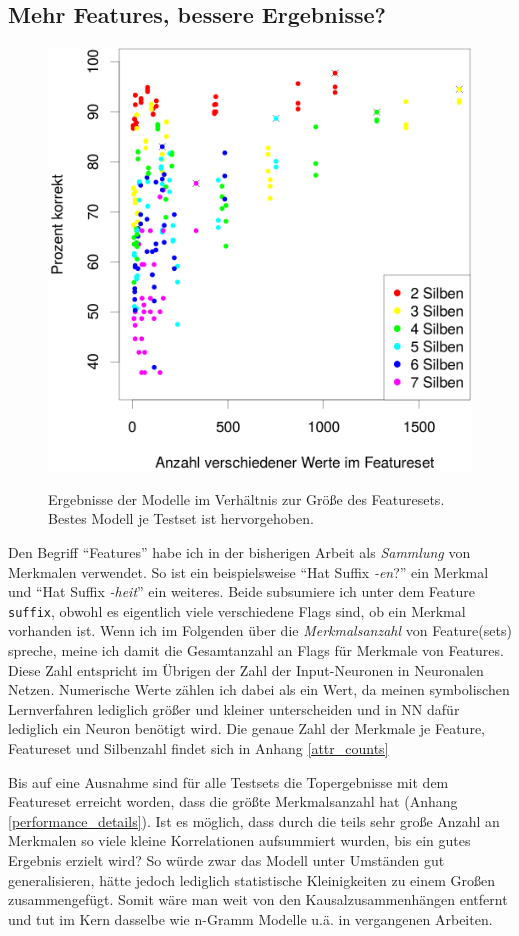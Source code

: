 \subsection{Mehr Features, bessere Ergebnisse?}
\label{features_performance_dependancy}
\begin{figure}[h]
    \centering
    \caption{Ergebnisse der Modelle im Verhältnis zur Größe des Featuresets. Bestes Modell je Testset ist hervorgehoben.}
    \includegraphics[width=.5\columnwidth]{figures/counts_vs_performance.png}
    \label{figure:counts_vs_performance}
\end{figure}
Den Begriff \enquote{Features} habe ich in der bisherigen Arbeit als \textit{Sammlung} von Merkmalen verwendet. So ist ein beispielsweise \enquote{Hat Suffix \textit{-en}?} ein  Merkmal und \enquote{Hat Suffix \textit{-heit}} ein weiteres. Beide subsumiere ich unter dem Feature \texttt{suffix}, obwohl es eigentlich viele verschiedene Flags sind, ob ein Merkmal vorhanden ist. Wenn ich im Folgenden über die \textit{Merkmalsanzahl} von Feature(sets) spreche, meine ich damit die Gesamtanzahl an Flags für Merkmale von Features. Diese Zahl entspricht im Übrigen der Zahl der Input-Neuronen in Neuronalen Netzen. Numerische Werte zählen ich dabei als ein Wert, da meinen symbolischen Lernverfahren lediglich größer und kleiner unterscheiden und in NN dafür lediglich ein Neuron benötigt wird. Die genaue Zahl der Merkmale je Feature, Featureset und Silbenzahl findet sich in Anhang \ref{attr_counts}

Bis auf eine Ausnahme sind für alle Testsets die Topergebnisse mit dem Featureset erreicht worden, dass die größte Merkmalsanzahl hat (Anhang \ref{performance_details}). Ist es möglich, dass durch die teils sehr große Anzahl an Merkmalen so viele kleine Korrelationen aufsummiert wurden, bis ein gutes Ergebnis erzielt wird? So würde zwar das Modell unter Umständen gut generalisieren, hätte jedoch lediglich statistische Kleinigkeiten zu einem Großen zusammengefügt. Somit wäre man weit von den Kausalzusammenhängen entfernt und tut im Kern dasselbe wie n-Gramm Modelle u.ä. in vergangenen Arbeiten.

